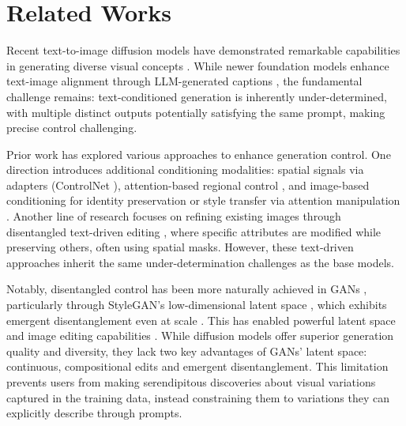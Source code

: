 \section{Related Works}


Recent text-to-image diffusion models have demonstrated remarkable capabilities in generating diverse visual concepts \cite{rombach2022high}. While newer foundation models enhance text-image alignment through LLM-generated captions \cite{esser2024scaling, betker2023improving}, the fundamental challenge remains: text-conditioned generation is inherently under-determined, with multiple distinct outputs potentially satisfying the same prompt, making precise control challenging.

Prior work has explored various approaches to enhance generation control. One direction introduces additional conditioning modalities: spatial signals via adapters (ControlNet \cite{zhang2023addingconditionalcontroltexttoimage}), attention-based regional control \cite{chen2024trainingfreeregionalpromptingdiffusion}, and image-based conditioning for identity preservation \cite{ye2023ipadaptertextcompatibleimage, li2023photomaker, shi2024instantbooth} or style transfer via attention manipulation \cite{hertz2024stylealignedimagegeneration}. Another line of research focuses on refining existing images through disentangled text-driven editing \cite{brooks2023instructpix2pix, wu2024turboedit, deutch2024turboedittextbasedimageediting, xu2023infedit, brack2024ledits++, parmar2023zero}, where specific attributes are modified while preserving others, often using spatial masks. However, these text-driven approaches inherit the same under-determination challenges as the base models.

Notably, disentangled control has been more naturally achieved in GANs \cite{gans}, particularly through StyleGAN's low-dimensional latent space \cite{karras2019style}, which exhibits emergent disentanglement even at scale \cite{kang2023scaling}. This has enabled powerful latent space and image editing capabilities \cite{abdal2019image2stylegan, wu2021stylespace, abdal2021styleflow}. While diffusion models offer superior generation quality and diversity, they lack two key advantages of GANs' latent space: continuous, compositional edits and emergent disentanglement. This limitation prevents users from making serendipitous discoveries about visual variations captured in the training data, instead constraining them to variations they can explicitly describe through prompts.

